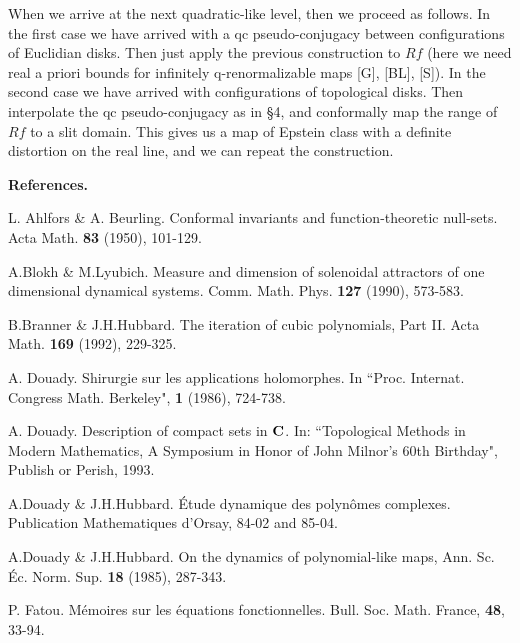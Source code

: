 When we arrive at the next quadratic-like level, then we proceed as follows.
In the first case we have arrived with a qc pseudo-conjugacy between
configurations of Euclidian disks. Then just apply the previous construction
to $Rf$ (here we need real a priori bounds for infinitely q-renormalizable maps
[G], [BL], [S]).
 In the second case we have arrived with configurations of
topological disks. Then  interpolate the qc pseudo-conjugacy as in \S 4,
and conformally map the range of $Rf$ to a slit domain. This gives us a
map of Epstein class  with a definite distortion on the real line,
and we can repeat the construction.




\bigskip
\centerline{\bf References.}\smallskip

{\item [AB]} L. Ahlfors \& A. Beurling. Conformal invariants and 
  function-theoretic null-sets. Acta Math. {\bf 83} (1950), 101-129.\smallskip



{\item [BL]} A.Blokh \& M.Lyubich. Measure and dimension of solenoidal
  attractors of one dimensional dynamical systems. Comm. Math. Phys.
  {\bf 127} (1990), 573-583.\smallskip
 

{\item [BH]} B.Branner \& J.H.Hubbard.   The iteration of cubic polynomials,
  Part II.  Acta Math. {\bf 169} (1992), 229-325.\smallskip

{\item [D1]} A. Douady. Shirurgie sur les applications holomorphes.
  In ``Proc. Internat. Congress Math. Berkeley", {\bf 1} (1986), 724-738.
  \smallskip

{\item [D2]} A. Douady. Description of compact sets in ${\bf C}$.
  In:
    ``Topological Methods in Modern Mathematics, A Symposium in
     Honor of John Milnor's 60th Birthday", Publish or Perish, 1993.\smallskip

{\item [DH1]} A.Douady \& J.H.Hubbard. \'{E}tude dynamique des polyn\^{o}mes
   complexes. Publication Mathematiques d'Orsay, 84-02 and 85-04.\smallskip


{\item [DH2]} A.Douady \& J.H.Hubbard. On the dynamics of polynomial-like maps,
    Ann. Sc. \'{E}c. Norm. Sup. {\bf 18} (1985), 287-343.\smallskip



{\item [F]} P. Fatou. M\'{e}moires sur les \'{e}quations fonctionnelles.
  Bull. Soc. Math. France, {\bf 48}, 33-94. 

